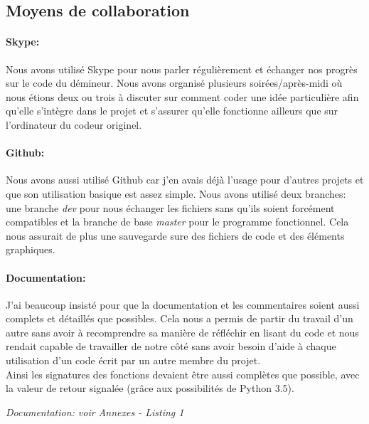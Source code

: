 \documentclass[12pt, a4paper]{article}
\newcommand{\annexe}[1]{
    \begin{flushright}
    \small{\emph{#1}}
    \end{flushright}
}
\begin{document}
\subsection{Moyens de collaboration}

\paragraph{Skype:}
Nous avons utilisé Skype pour nous parler régulièrement et échanger nos progrès
sur le code du démineur. Nous avons organisé plusieurs soirées/après-midi où
nous étions deux ou trois à discuter sur comment coder une idée particulière
afin qu'elle s'intègre dans le projet et s'assurer qu'elle fonctionne ailleurs
que sur l'ordinateur du codeur originel.

\paragraph{Github:}
Nous avons aussi utilisé Github car j'en avais déjà l'usage pour d'autres
projets et que son utilisation basique est assez simple. Nous avons utilisé
deux branches: une branche \emph{dev} pour nous échanger les fichiers sans
qu'ils soient forcément compatibles et la branche de base \emph{master} pour
le programme fonctionnel. Cela nous assurait de plus une sauvegarde sure des
fichiers de code et des éléments graphiques.

\paragraph{Documentation:}
J'ai beaucoup insisté pour que la documentation et les commentaires soient
aussi complets et détaillés que possibles. Cela nous a permis de partir du
travail d'un autre sans avoir à recomprendre sa manière de réfléchir en lisant
du code et nous rendait capable de travailler de notre côté sans avoir besoin
d'aide à chaque utilisation d'un code écrit par un autre membre du projet. \\
Ainsi les signatures des fonctions devaient être aussi complètes que possible,
avec la valeur de retour signalée (grâce aux possibilités de Python 3.5).
\annexe{Documentation: voir Annexes - Listing 1}


\newpage

\end{document}
